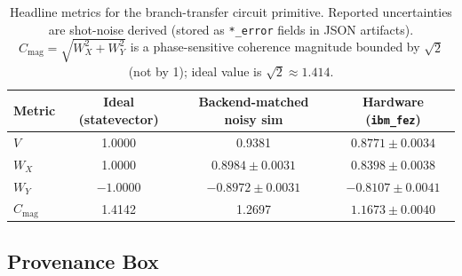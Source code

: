 \documentclass[11pt]{article}
\begin{document}
\begin{table}[!b]
\centering
\caption{Headline metrics for the branch-transfer circuit primitive. Reported uncertainties are shot-noise derived (stored as \texttt{*\_error} fields in JSON artifacts). $C_\mathrm{mag} = \sqrt{W_X^2 + W_Y^2}$ is a phase-sensitive coherence magnitude bounded by $\sqrt{2}$ (not by 1); ideal value is $\sqrt{2} \approx 1.414$.}
\label{tab:headline}
\begin{tabular}{lccc}
\toprule
Metric & Ideal (statevector) & Backend-matched noisy sim & Hardware (\texttt{ibm\_fez}) \\
\midrule
$V$ & 1.0000 & 0.9381 & $0.8771 \pm 0.0034$ \\
$W_X$ & 1.0000 & $0.8984 \pm 0.0031$ & $0.8398 \pm 0.0038$ \\
$W_Y$ & $-1.0000$ & $-0.8972 \pm 0.0031$ & $-0.8107 \pm 0.0041$ \\
$C_\mathrm{mag}$ & 1.4142 & 1.2697 & $1.1673 \pm 0.0040$ \\
\bottomrule
\end{tabular}
\end{table}

\subsection{Provenance Box}
\label{subsec:provenance}
\end{document}
